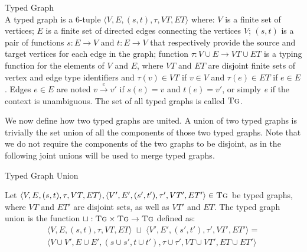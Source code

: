 \begin{definition}{Typed Graph\\}
\label{def:typed_graph}
A typed graph is a 6-tuple $\langle V,E,(s,t),\tau, VT, ET\rangle$ where: $V$ is a finite set of vertices; $E$ is a finite set of directed edges connecting the vertices $V$; $(s,t)$ is a pair of functions $s: E\rightarrow V$ and $t: E\rightarrow V$ that respectively provide the source and target vertices for each edge in the graph; function $\tau:V\cup E\rightarrow VT \cup ET$ is a typing function for the elements of $V$ and $E$, where $VT$ and $ET$ are disjoint finite sets of vertex and edge type identifiers and $\tau(v)\in VT$ if $v\in V$ and $\tau(e)\in ET$ if $e\in E$. Edges $e\in E$ are noted $v\xrightarrow{e} v'$ if $s(e)=v$ and $t(e)=v'$, or simply \emph{e} if the context is unambiguous. The set of all typed graphs is called $\textsc{Tg}$. 
\end{definition}

We now define how two typed graphs are united. A union of two typed graphs is trivially the set union of all the components of those two typed graphs. Note that we do not require the components of the two graphs to be disjoint, as in the following joint unions will be used to merge typed graphs.


\begin{definition}{Typed Graph Union\\}
\label{def:typed_graph_union}

Let $\langle V,E,(s,t),\tau,VT,ET\rangle,\langle V',E',(s',t'),\tau',VT',ET'\rangle\in \textsc{Tg}$ be typed graphs, where $VT$ and $ET'$ are disjoint sets, as well as $VT'$ and $ET$. The typed graph union is the function $\sqcup :\textsc{Tg}\times \textsc{Tg}\rightarrow \textsc{Tg}$ defined as:
\begin{multline*}
\big\langle V,E,(s,t),\tau,VT,ET\big\rangle\;\sqcup\;\big\langle V',E',(s',t'),\tau',VT',ET'\big\rangle=\\\big\langle V\cup V', E\cup
E',(s\cup s', t\cup t'), \tau\cup \tau', VT\cup VT', ET\cup ET'\big\rangle
\end{multline*}
\end{definition}


